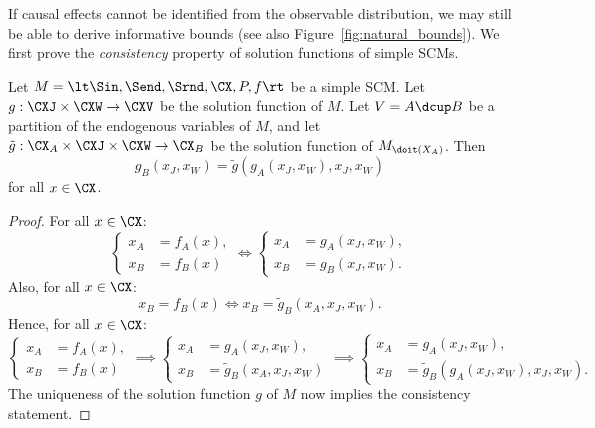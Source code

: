 If causal effects cannot be identified from the observable distribution, we may still be able to derive informative bounds (see also Figure~\ref{fig:natural_bounds}).
We first prove the \emph{consistency} property of solution functions of simple SCMs.
\begin{Prp}\label{prp:simple_scm_consistency}
  Let $M = \lt \Sin, \Send, \Srnd, \CX, P, f \rt$ be a simple SCM.
  Let $g : \CXJ \times \CXW \to \CXV$ be the solution function of $M$.
  Let $V = A \dcup B$ be a partition of the endogenous variables of $M$,
  and let $\tilde{g} : \CX_A \times \CXJ \times \CXW \to \CX_B$ be the solution function of $M_{\doit(X_A)}$. Then
  $$g_B(x_J,x_W) = \tilde{g}(g_A(x_J,x_W),x_J,x_W)$$
  for all $x \in \CX$.
\end{Prp}
\begin{proof}
  For all $x \in \CX$:
  $$\begin{cases}
    x_A & = f_A(x), \\
    x_B & = f_B(x)
  \end{cases} \iff
  \begin{cases}
    x_A & = g_A(x_J,x_W), \\
    x_B & = g_B(x_J,x_W).
  \end{cases}$$
  Also, for all $x \in \CX$:
  $$x_B = f_B(x)
   \iff x_B = \tilde{g}_B(x_A,x_J,x_W).$$
  Hence, for all $x \in \CX$:
  $$\begin{cases}
    x_A & = f_A(x), \\
    x_B & = f_B(x)
  \end{cases} \implies
  \begin{cases}
    x_A & = g_A(x_J,x_W), \\
    x_B & = \tilde{g}_B(x_A,x_J,x_W)
  \end{cases}\implies
  \begin{cases}
    x_A & = g_A(x_J,x_W), \\
    x_B & = \tilde{g}_B(g_A(x_J,x_W),x_J,x_W).
  \end{cases}$$
  The uniqueness of the solution function $g$ of $M$ now implies the consistency statement.
\end{proof}

